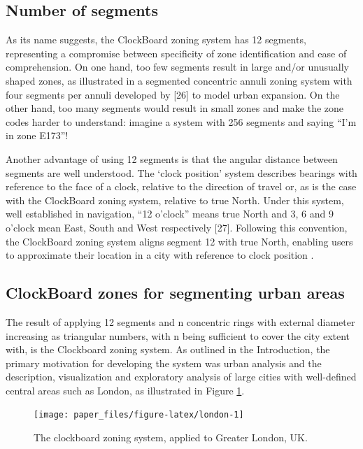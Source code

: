 \documentclass{josis}
\begin{document}
\hypertarget{number-of-segments}{%
\subsection{Number of segments}\label{number-of-segments}}

As its name suggests, the ClockBoard zoning system has 12 segments, representing a compromise between specificity of zone identification and ease of comprehension.
On one hand, too few segments result in large and/or unusually shaped zones, as illustrated in a segmented concentric annuli zoning system with four segments per annuli developed by {[}26{]} to model urban expansion.
On the other hand, too many segments would result in small zones and make the zone codes harder to understand: imagine a system with 256 segments and saying ``I'm in zone E173''!

Another advantage of using 12 segments is that the angular distance between segments are well understood.
The `clock position' system describes bearings with reference to the face of a clock, relative to the direction of travel or, as is the case with the ClockBoard zoning system, relative to true North.
Under this system, well established in navigation, ``12 o'clock'' means true North and 3, 6 and 9 o'clock mean East, South and West respectively {[}27{]}.
Following this convention, the ClockBoard zoning system aligns segment 12 with true North, enabling users to approximate their location in a city with reference to clock position .

\hypertarget{clockboard-zones-for-segmenting-urban-areas}{%
\subsection{ClockBoard zones for segmenting urban areas}\label{clockboard-zones-for-segmenting-urban-areas}}

The result of applying 12 segments and n concentric rings with external diameter increasing as triangular numbers, with n being sufficient to cover the city extent with, is the Clockboard zoning system.
As outlined in the Introduction, the primary motivation for developing the system was urban analysis and the description, visualization and exploratory analysis of large cities with well-defined central areas such as London, as illustrated in Figure \ref{fig:london}.

\begin{figure}

{\centering \texttt{[image: paper\_files/figure-latex/london-1]} 

}

\caption{The clockboard zoning system, applied to Greater London, UK.}\label{fig:london}
\end{figure}
\end{document}
